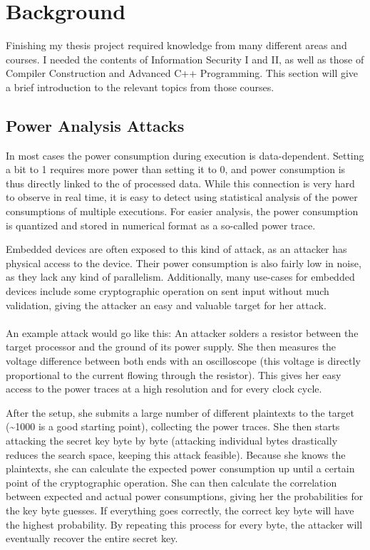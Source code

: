 \section{Background}
\label{background}
Finishing my thesis project required knowledge from many different areas and courses.
I needed the contents of Information Security I and II, as well as those of Compiler Construction and Advanced C++ Programming.
This section will give a brief introduction to the relevant topics from those courses.

\subsection{Power Analysis Attacks}
In most cases the power consumption during execution is data-dependent.
Setting a bit to 1 requires more power than setting it to 0, and power consumption is thus directly linked to the \hammingw{} of processed data.
While this connection is very hard to observe in real time, it is easy to detect using statistical analysis of the power consumptions of multiple executions.
For easier analysis, the power consumption is quantized and stored in numerical format as a so-called power trace.

Embedded devices are often exposed to this kind of attack, as an attacker has physical access to the device.
Their power consumption is also fairly low in noise, as they lack any kind of parallelism.
Additionally, many use-cases for embedded devices include some cryptographic operation on sent input without much validation, giving the attacker an easy and valuable target for her attack.
\\
\\
An example attack would go like this:
An attacker solders a resistor between the target processor and the ground of its power supply.
She then measures the voltage difference between both ends with an oscilloscope (this voltage is directly proportional to the current flowing through the resistor).
This gives her easy access to the power traces at a high resolution and for every clock cycle.

After the setup, she submits a large number of different plaintexts to the target (\textasciitilde 1000 is a good starting point), collecting the power traces.
She then starts attacking the secret key byte by byte (attacking individual bytes drastically reduces the search space, keeping this attack feasible).
Because she knows the plaintexts, she can calculate the expected power consumption up until a certain point of the cryptographic operation.
She can then calculate the correlation between expected and actual power consumptions, giving her the probabilities for the key byte guesses.
If everything goes correctly, the correct key byte will have the highest probability.
By repeating this process for every byte, the attacker will eventually recover the entire secret key.

